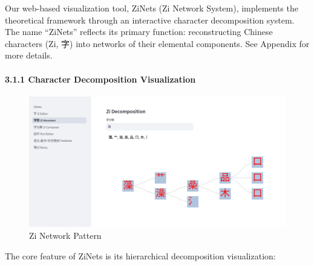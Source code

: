 \documentclass[
  11pt,
  letterpaper,
]{article}
\begin{document}
Our web-based visualization tool, ZiNets (Zi Network System), implements
the theoretical framework through an interactive character decomposition
system. The name ``ZiNets'' reflects its primary function:
reconstructing Chinese characters (Zi, 字) into networks of their
elemental components. See Appendix for more details.

\hypertarget{character-decomposition-visualization}{%
\paragraph{3.1.1 Character Decomposition
Visualization}\label{character-decomposition-visualization}}

\begin{figure}
\centering
\includegraphics{./images/app_decomposing-zi-2.png}
\caption{Zi Network Pattern}
\end{figure}

The core feature of ZiNets is its hierarchical decomposition
visualization:
\end{document}
